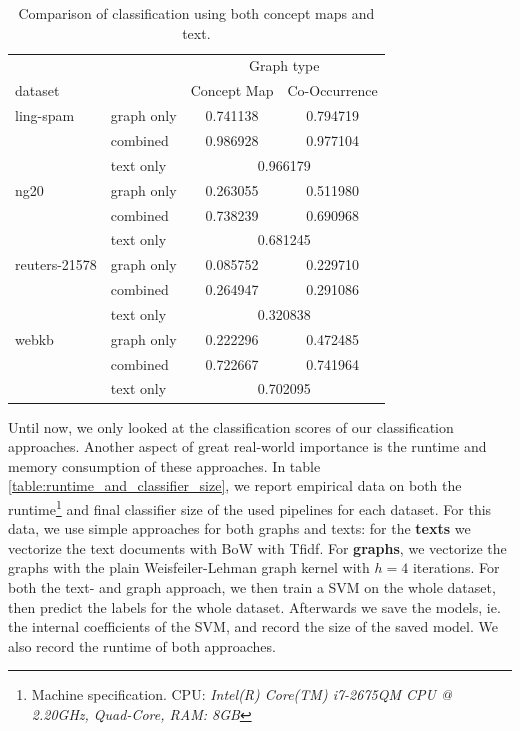 \begin{table}[htb!]
\centering
\begin{tabular}{llcc}
  &  & \multicolumn{2}{c}{Graph type} \\
   dataset   & &  Concept Map &  Co-Occurrence \\
\midrule
ling-spam 
          & graph only &  0.741138 &  0.794719\\
          & combined &  0.986928 &  0.977104\\
          & text only & \multicolumn{2}{c}{ 0.966179 }\\
\midrule
ng20 
          & graph only &  0.263055 &  0.511980\\
          & combined &  0.738239 &  0.690968\\
          & text only & \multicolumn{2}{c}{ 0.681245 }\\
\midrule
reuters-21578 
          & graph only &  0.085752 &  0.229710\\
          & combined &  0.264947 &  0.291086\\
          & text only & \multicolumn{2}{c}{ 0.320838 }\\
\midrule
webkb 
          & graph only &  0.222296 &  0.472485\\
          & combined &  0.722667 &  0.741964\\
          & text only & \multicolumn{2}{c}{ 0.702095 }\\	
\bottomrule
\end{tabular}
\caption[Results: Combined text- and graph features]{Comparison of classification using both concept maps and text.}%
\label{table:results_comparison_combined}
\end{table}


Until now, we only looked at the classification scores of our classification approaches.
Another aspect of great real-world importance is the runtime and memory consumption of these approaches.
In table \ref{table:runtime_and_classifier_size}, we report empirical data on both the runtime\footnote{Machine specification. CPU: \textit{Intel(R) Core(TM) i7-2675QM CPU @ 2.20GHz, Quad-Core, RAM: \textit{8GB}}} and final classifier size of the used pipelines for each dataset.
For this data, we use simple approaches for both graphs and texts: for the \textbf{texts} we vectorize the text documents with BoW with Tfidf.
For \textbf{graphs}, we vectorize the graphs with the plain Weisfeiler-Lehman graph kernel with $h = 4$ iterations.
For both the text- and graph approach, we then train a SVM on the whole dataset, then predict the labels for the whole dataset. Afterwards we save the models, ie. the internal coefficients of the SVM, and record the size of the saved model.
We also record the runtime of both approaches.

